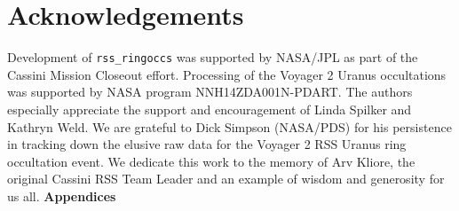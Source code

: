 \documentclass[titlepage, 12pt]{article}
\begin{document}
    \section*{Acknowledgements}
        Development of \texttt{rss\_ringoccs} was supported by
        NASA/JPL as part of the Cassini Mission Closeout effort.
        Processing of the Voyager 2 Uranus occultations was 
        supported by NASA program NNH14ZDA001N-PDART.
        The authors especially appreciate the support and
        encouragement of Linda Spilker and Kathryn Weld. We are grateful to
        Dick Simpson (NASA/PDS) for his persistence in tracking down the
        elusive raw data for the Voyager 2 RSS Uranus ring occultation event. We
        dedicate this work to the memory of Arv Kliore, the
        original Cassini RSS Team Leader and an example of
        wisdom and generosity for us all.
    \newpage
    \LARGE{\textbf{Appendices}}
    \normalsize
\end{document}
